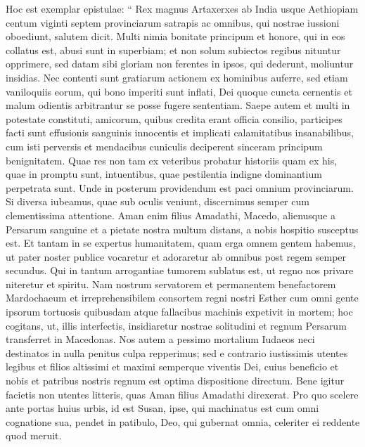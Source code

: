 \begin{biblechapter}
\begin{biblechapter}
\begin{biblechapter}
\begin{biblechapter}
\begin{biblechapter}
\begin{biblechapter}
\begin{biblechapter}
\begin{biblechapter}
 \versec Hoc est exemplar epistulae:
 \versed “ Rex magnus Artaxerxes ab India usque Aethiopiam centum viginti septem provinciarum satrapis ac omnibus, qui nostrae iussioni oboediunt, salutem dicit. 
\versee Multi nimia bonitate principum et honore, qui in eos collatus est, abusi sunt in superbiam; 
\versef et non solum subiectos regibus nituntur opprimere, sed datam sibi gloriam non ferentes in ipsos, qui dederunt, moliuntur insidias. 
 \verseg Nec contenti sunt gratiarum actionem ex hominibus auferre, sed etiam vaniloquiis eorum, qui bono imperiti sunt inflati, Dei quoque cuncta cernentis et malum odientis arbitrantur se posse fugere sententiam. 
\verseh Saepe autem et multi in potestate constituti, amicorum, quibus credita erant officia consilio, participes facti sunt effusionis sanguinis innocentis et implicati calamitatibus insanabilibus, 
\versei cum isti perversis et mendacibus cuniculis deciperent sinceram principum benignitatem. 
\versek Quae res non tam ex veteribus probatur historiis quam ex his, quae in promptu sunt, intuentibus, quae pestilentia indigne dominantium perpetrata sunt. 
\versel Unde in posterum providendum est paci omnium provinciarum. 
\versem Si diversa iubeamus, quae sub oculis veniunt, discernimus semper cum clementissima attentione.
 \versen Aman enim filius Amadathi, Macedo, alienusque a Persarum sanguine et a pietate nostra multum distans, a nobis hospitio susceptus est. 
\verseo Et tantam in se expertus humanitatem, quam erga omnem gentem habemus, ut pater noster publice vocaretur et adoraretur ab omnibus post regem semper secundus. 
\versep Qui in tantum arrogantiae tumorem sublatus est, ut regno nos privare niteretur et spiritu. 
\verseq Nam nostrum servatorem et permanentem benefactorem Mardochaeum et irreprehensibilem consortem regni nostri Esther cum omni gente ipsorum tortuosis quibusdam atque fallacibus machinis expetivit in mortem; 
 \verser hoc cogitans, ut, illis interfectis, insidiaretur nostrae solitudini et regnum Persarum transferret in Macedonas.
 \verses Nos autem a pessimo mortalium Iudaeos neci destinatos in nulla penitus culpa repperimus; sed e contrario iustissimis utentes legibus 
\verset et filios altissimi et maximi semperque viventis Dei, cuius beneficio et nobis et patribus nostris regnum est optima dispositione directum.
 \verseu Bene igitur facietis non utentes litteris, quas Aman filius Amadathi direxerat. 
\versev Pro quo scelere ante portas huius urbis, id est Susan, ipse, qui machinatus est cum omni cognatione sua, pendet in patibulo, Deo, qui gubernat omnia, celeriter ei reddente quod meruit.

\end{biblechapter}
\end{biblechapter}
\end{biblechapter}
\end{biblechapter}
\end{biblechapter}
\end{biblechapter}
\end{biblechapter}
\end{biblechapter}
